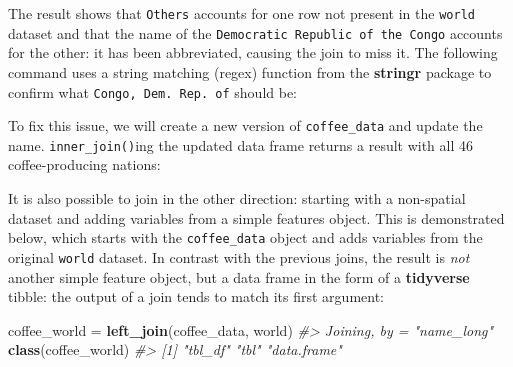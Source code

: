 \documentclass[]{krantz}
\newenvironment{Shaded}{\begin{snugshade}}{\end{snugshade}}
\newcommand{\CommentTok}[1]{\textcolor[rgb]{0.37,0.37,0.37}{\textit{#1}}}
\newcommand{\KeywordTok}[1]{\textcolor[rgb]{0.27,0.27,0.27}{\textbf{#1}}}
\newcommand{\NormalTok}[1]{#1}
\newcommand{\OperatorTok}[1]{\textcolor[rgb]{0.43,0.43,0.43}{\textbf{#1}}}
\newcommand{\StringTok}[1]{\textcolor[rgb]{0.5,0.5,0.5}{#1}}
\begin{document}
The result shows that \texttt{Others} accounts for one row not present in the \texttt{world} dataset and that the name of the \texttt{Democratic\ Republic\ of\ the\ Congo} accounts for the other:
it has been abbreviated, causing the join to miss it.
The following command uses a string matching (regex) function from the \textbf{stringr} package to confirm what \texttt{Congo,\ Dem.\ Rep.\ of} should be:

\begin{Shaded}
\end{Shaded}

To fix this issue, we will create a new version of \texttt{coffee\_data} and update the name.
\texttt{inner\_join()}ing the updated data frame returns a result with all 46 coffee-producing nations:

\begin{Shaded}
\end{Shaded}

It is also possible to join in the other direction: starting with a non-spatial dataset and adding variables from a simple features object.
This is demonstrated below, which starts with the \texttt{coffee\_data} object and adds variables from the original \texttt{world} dataset.
In contrast with the previous joins, the result is \emph{not} another simple feature object, but a data frame in the form of a \textbf{tidyverse} tibble:
the output of a join tends to match its first argument:

\begin{Shaded}
\begin{Highlighting}[]
\NormalTok{coffee_world =}\StringTok{ }\KeywordTok{left_join}\NormalTok{(coffee_data, world)}
\CommentTok{#> Joining, by = "name_long"}
\KeywordTok{class}\NormalTok{(coffee_world)}
\CommentTok{#> [1] "tbl_df"     "tbl"        "data.frame"}
\end{Highlighting}
\end{Shaded}
\end{document}
